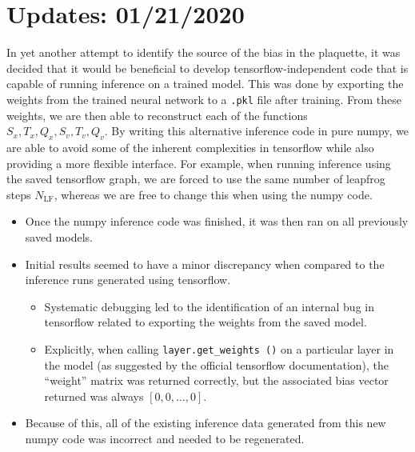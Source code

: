 \section{Updates: 01/21/2020}%
\label{sec:updates_2020_01_16}
In yet another attempt to identify the source of the bias in the plaquette, it
was decided that it would be beneficial to develop tensorflow-independent code
that is capable of running inference on a trained model.
%
This was done by exporting the weights from the trained neural network to a
\texttt{.pkl} file after training.
%
From these weights, we are then able to reconstruct each of the functions
$S_{x}, T_{x}, Q_{x}, S_{v}, T_{v}, Q_{v}$.
%
By writing this alternative inference code in pure numpy, we are able to avoid
some of the inherent complexities in tensorflow while also providing a more
flexible interface.
%
For example, when running inference using the saved tensorflow graph, we are
forced to use the same number of leapfrog steps $N_{\mathrm{LF}}$, whereas we
are free to change this when using the numpy code.
%
\begin{itemize}
  \item Once the numpy inference code was finished, it was then ran on all
    previously saved models.
  \item Initial results seemed to have a minor discrepancy when compared to the
    inference runs generated using tensorflow.
    \begin{itemize}
      \item Systematic debugging led to the identification of an internal bug
        in tensorflow related to exporting the weights from the saved model.
      \item Explicitly, when calling \texttt{layer.get\_weights ()} on a
        particular layer in the model (as suggested by the official tensorflow
        documentation), the ``weight'' matrix was returned correctly, but the
        associated bias vector returned was always $[0, 0, \ldots, 0]$.
    \end{itemize}
  \item Because of this, all of the existing inference data generated from this
    new numpy code was incorrect and needed to be regenerated.
\end{itemize}
%
\clearpage
